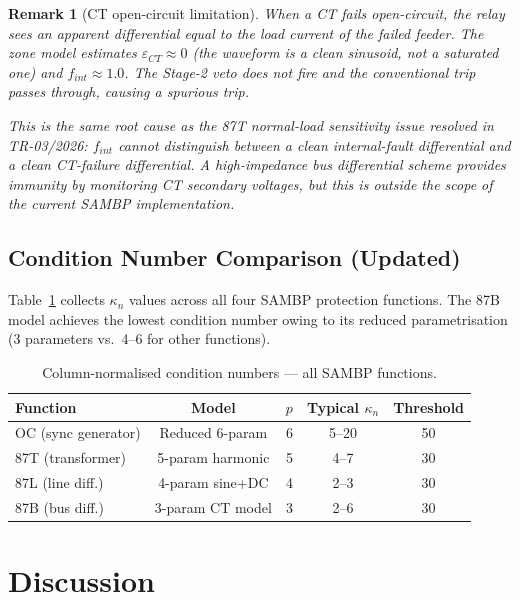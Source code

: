 \documentclass[12pt,a4paper]{article}
\newtheorem{remark}{Remark}[section]
\newcommand{\kappan}{\kappa_n}
\begin{document}
\begin{remark}[CT open-circuit limitation]
\label{rem:ct_open}
When a CT fails open-circuit, the relay sees an apparent differential equal
to the load current of the failed feeder.  The zone model estimates
$\varepsilon_{CT} \approx 0$ (the waveform is a clean sinusoid, not
a saturated one) and $f_{int} \approx 1.0$.  The Stage-2 veto does not fire
and the conventional trip passes through, causing a spurious trip.

This is the same root cause as the 87T normal-load sensitivity issue resolved
in TR-03/2026: $f_{int}$ cannot distinguish between a clean internal-fault
differential and a clean CT-failure differential.  A high-impedance bus
differential scheme provides immunity by monitoring CT secondary voltages, but
this is outside the scope of the current SAMBP implementation.
\end{remark}

\subsection{Condition Number Comparison (Updated)}

Table~\ref{tab:kappa_all} collects $\kappan$ values across all four SAMBP
protection functions.  The 87B model achieves the lowest condition number
owing to its reduced parametrisation (3 parameters vs.\ 4--6 for other functions).

\begin{table}[h!]
\centering
\caption{Column-normalised condition numbers — all SAMBP functions.}
\label{tab:kappa_all}
\begin{tabular}{lcccc}
\toprule
Function & Model & $p$ & Typical $\kappan$ & Threshold\\
\midrule
OC (sync generator)   & Reduced 6-param & 6 & 5--20  & 50\\
87T (transformer)     & 5-param harmonic & 5 & 4--7   & 30\\
87L (line diff.)      & 4-param sine+DC  & 4 & 2--3   & 30\\
87B (bus diff.)       & 3-param CT model & 3 & 2--6   & 30\\
\bottomrule
\end{tabular}
\end{table}

\section{Discussion}
\label{sec:discussion}
\end{document}
